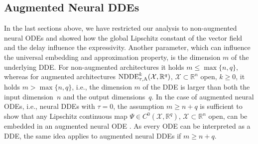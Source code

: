 \documentclass[10pt]{article}
\numberwithin{equation}{section}
\begin{document}
	
	
	
	
	
	\subsection{Augmented Neural DDEs}
	\label{sec:augmented}
	
	In the last sections above, we have restricted our analysis to non-augmented neural ODEs and showed how the global Lipschitz constant of the vector field and the delay influence the expressivity. Another parameter, which can influence the universal embedding and approximation property, is the dimension $m$ of the underlying DDE. For non-augmented architectures it holds $m\leq \max\{n,q\}$, whereas for augmented architectures $\textup{NDDE}_{\tau,\textup{A}}^k(\mathcal{X},\mathbb{R}^q)$, $\mathcal{X}\subset \mathbb{R}^n$ open, $k\geq 0$, it holds $m> \max\{n,q\}$, i.e., the dimension $m$ of the DDE is larger than both the input dimension~$n$ and the output dimensions~$q$. In the case of augmented neural ODEs, i.e., neural DDEs with $\tau = 0$, the assumption $m \geq n+q$ is sufficient to show that any Lipschitz continuous map $\Psi \in C^0(\mathcal{X},\mathbb{R}^{q})$, $\mathcal{X} \subset \mathbb{R}^{n}$ open, can be embedded in an augmented neural ODE  \cite{Kuehn2023}. As every ODE can be interpreted as a DDE, the same idea applies to augmented neural DDEs if $m \geq n+q$. 
	
\end{document}
